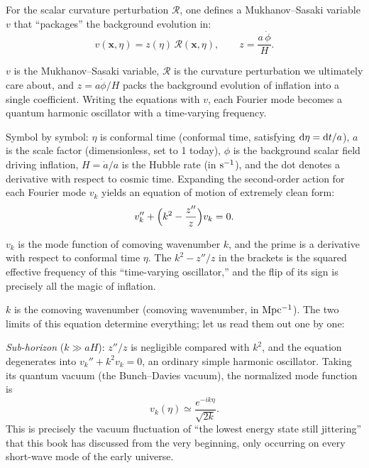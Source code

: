 For the scalar curvature perturbation \(\mathcal R\), one defines a Mukhanov--Sasaki variable \(v\) that ``packages'' the background evolution in:
\begin{equation}
  v(\bm x,\eta)=z(\eta)\,\mathcal R(\bm x,\eta),
  \qquad
  z=\frac{a\,\dot\phi}{H} .
  \label{eq:e23-ms-variable}
\end{equation}
\begin{formulaexplain}
\(v\) is the Mukhanov--Sasaki variable, \(\mathcal R\) is the curvature perturbation we ultimately care about, and \(z=a\dot\phi/H\) packs the background evolution of inflation into a single coefficient. Writing the equations with \(v\), each Fourier mode becomes a quantum harmonic oscillator with a time-varying frequency.
\end{formulaexplain}
Symbol by symbol: \(\eta\) is conformal time (conformal time, satisfying \({\rm d}\eta={\rm d}t/a\)), \(a\) is the scale factor (dimensionless, set to 1 today), \(\phi\) is the background scalar field driving inflation, \(H=\dot a/a\) is the Hubble rate (in \({\rm s^{-1}}\)), and the dot denotes a derivative with respect to cosmic time. Expanding the second-order action for each Fourier mode \(v_k\) yields an equation of motion of extremely clean form:
\begin{equation}
  v_k''+\Bigl(k^2-\frac{z''}{z}\Bigr)v_k=0 .
  \label{eq:e23-ms-equation}
\end{equation}
\begin{formulaexplain}
\(v_k\) is the mode function of comoving wavenumber \(k\), and the prime is a derivative with respect to conformal time \(\eta\). The \(k^2-z''/z\) in the brackets is the squared effective frequency of this ``time-varying oscillator,'' and the flip of its sign is precisely all the magic of inflation.
\end{formulaexplain}
\(k\) is the comoving wavenumber (comoving wavenumber, in \({\rm Mpc^{-1}}\)). The two limits of this equation determine everything; let us read them out one by one:

\emph{Sub-horizon} (\(k\gg aH\)): \(z''/z\) is negligible compared with \(k^2\), and the equation degenerates into \(v_k''+k^2v_k=0\), an ordinary simple harmonic oscillator. Taking its quantum vacuum (the Bunch--Davies vacuum), the normalized mode function is
\[
  v_k(\eta)\simeq\frac{e^{-ik\eta}}{\sqrt{2k}} .
\]
This is precisely the vacuum fluctuation of ``the lowest energy state still jittering'' that this book has discussed from the very beginning, only occurring on every short-wave mode of the early universe.

